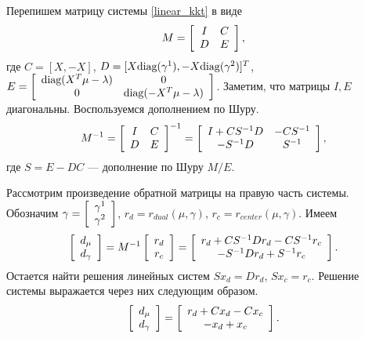 \documentclass[12pt]{article}
\begin{document}
			Перепишем матрицу системы \ref{linear_kkt} в виде
			$$
			M =
			\left [
			\begin{array}[c]{cc}
				I & C\\
				D & E
			\end{array}
			\right ],
			$$
			где $C = [X, -X]$, $D = [X \mbox{diag}(\gamma^1), - X \mbox{diag}(\gamma^2)]^T$, $E = \left[\begin{array} [c]{cc}\mbox{diag}(X^T \mu - \lambda) & 0 \\
			0 &  \mbox{diag}(- X^T \mu - \lambda) 
			\end{array}\right]$.
			Заметим, что матрицы $I, E$ диагональны. Воспользуемся дополнением по Шуру.
			$$
			M^{-1} = 
			\left [
			\begin{array}[c]{cc}
				I & C\\
				D & E
			\end{array}
			\right ]^{-1}
			=
			\left [
			\begin{array}[c]{cc}
				I + C S^{-1} D& - CS^{-1}\\
				- S^{-1} D & S^{-1}
			\end{array}
			\right ],
			$$
			где $S = E - DC$ — дополнение по Шуру $M / E$.
			
			Рассмотрим произведение обратной матрицы на правую часть системы. Обозначим $\gamma = \left[\begin{array}[c]{c}\gamma^1\\ \gamma^2\end{array} \right]$, $r_d = r_{dual}(\mu, \gamma)$, $r_c = r_{center}(\mu, \gamma)$. Имеем
			$$ 
			\left [
			\begin{array}[c]{c}
				d_\mu \\
				d_\gamma
			\end{array}
			\right ]
			= M^{-1} 
			\left [
			\begin{array}[c]{c}
				r_d \\
				r_c
			\end{array}
			\right ]
			=
			\left [
			\begin{array}[c]{c}
				r_d + CS^{-1} D r_d - C S^{-1} r_c \\
				- S^{-1} D r_d + S^{-1} r_c
			\end{array}
			\right ].
			$$
			Остается найти решения линейных систем $S x_d = D r_d$, $S x_c = r_c$. Решение системы выражается через них следующим образом.
			$$
			\left [
			\begin{array}[c]{c}
				d_\mu \\
				d_\gamma
			\end{array}
			\right ]
			=
			\left [
			\begin{array}[c]{c}
				r_d + C x_d - C x_c \\
				- x_d + x_c
			\end{array}
			\right ].
			$$
			
\end{document}

